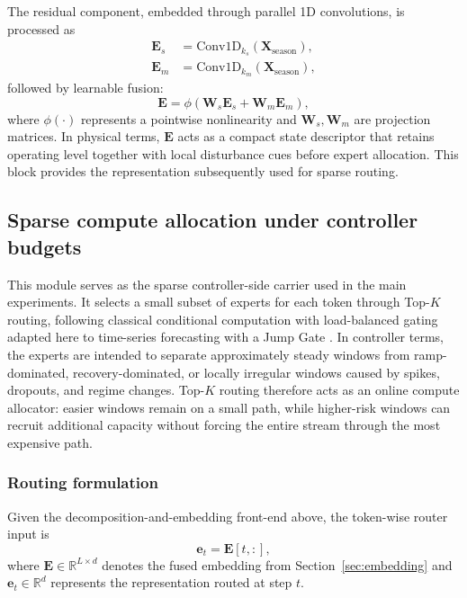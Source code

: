 \documentclass[review,1p,times]{elsarticle}
\begin{document}
The residual component, embedded through parallel 1D convolutions, is processed as
\begin{align}
\mathbf{E}_s &= \text{Conv1D}_{k_s}(\mathbf{X}_{\text{season}}), \\
\mathbf{E}_m &= \text{Conv1D}_{k_m}(\mathbf{X}_{\text{season}}),
\end{align}
followed by learnable fusion:
\begin{equation}
\mathbf{E} = \phi\!\left(\mathbf{W}_s\mathbf{E}_s + \mathbf{W}_m\mathbf{E}_m\right),
\end{equation}
where $\phi(\cdot)$ represents a pointwise nonlinearity and $\mathbf{W}_s,\mathbf{W}_m$ are projection matrices. In physical terms, $\mathbf{E}$ acts as a compact state descriptor that retains operating level together with local disturbance cues before expert allocation. This block provides the representation subsequently used for sparse routing.\label{sec:embedding}

\subsection{Sparse compute allocation under controller budgets}
\label{sec:moe}
This module serves as the sparse controller-side carrier used in the main experiments. It selects a small subset of experts for each token through Top-$K$ routing, following classical conditional computation with load-balanced gating adapted here to time-series forecasting with a Jump Gate \citep{jacobs1991moe,fedus2022switch}. In controller terms, the experts are intended to separate approximately steady windows from ramp-dominated, recovery-dominated, or locally irregular windows caused by spikes, dropouts, and regime changes. Top-$K$ routing therefore acts as an online compute allocator: easier windows remain on a small path, while higher-risk windows can recruit additional capacity without forcing the entire stream through the most expensive path.

\subsubsection{Routing formulation}
Given the decomposition-and-embedding front-end above, the token-wise router input is
\begin{equation}
\mathbf{e}_t = \mathbf{E}[t,:],
\end{equation}
where $\mathbf{E}\in\mathbb{R}^{L\times d}$ denotes the fused embedding from Section~\ref{sec:embedding} and $\mathbf{e}_t\in\mathbb{R}^d$ represents the representation routed at step $t$.
\end{document}
